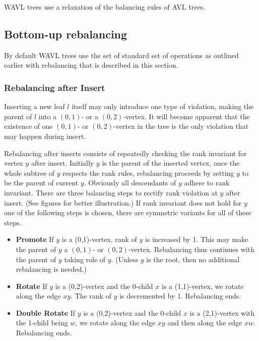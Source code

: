 WAVL trees use a relaxation of the balancing rules of AVL trees\cite{avl}.

\subsection{Bottom-up rebalancing}

By default WAVL trees use the set of standard set of operations as outlined earlier with rebalancing that is described in this section.


\subsubsection*{Rebalancing after Insert}

Inserting a new leaf $l$ itself may only introduce one type of violation, making the parent of $l$ into a $(0,1)$- or a $(0,2)$-vertex. It will become apparent that the existence of one $(0,1)$- or $(0,2)$-vertex in the tree is the only violation that may happen during insert. 

Rebalancing after inserts consists of repeatedly checking the rank invariant for vertex $y$ after insert. Initially $y$ is the parent of the inserted vertex, once the whole subtree of $y$ respects the rank rules, rebalancing proceeds by setting $y$ to be the parent of current $y$. Obviously all descendants of $y$ adhere to rank invariant. There are three balancing steps to rectify rank violation at $y$ after insert. (See figures for better illustration.) If rank invariant does not hold for $y$ one of the following steps is chosen, there are symmetric variants for all of these steps. 

\begin{itemize}
	\item \textbf{Promote} If $y$ is a (0,1)-vertex, rank of $y$ is increased by 1. This may make the parent of $y$ a $(0,1)$- or $(0,2)$-vertex. Rebalancing thus continues with the parent of $y$ taking role of $y$. (Unless $y$ is the root, then no additional rebalancing is needed.)
	\item \textbf{Rotate} If $y$ is a (0,2)-vertex and the 0-child $x$ is a (1,1)-vertex, we rotate along the edge $xy$. The rank of $y$ is decremented by 1. Rebalancing ends.
	\item \textbf{Double Rotate} If $y$ is a (0,2)-vertex and the 0-child $x$ is a (2,1)-vertex with the 1-child being $w$, we rotate along the edge $xy$ and then along the edge $xw$. Rebalancing ends.
\end{itemize}

